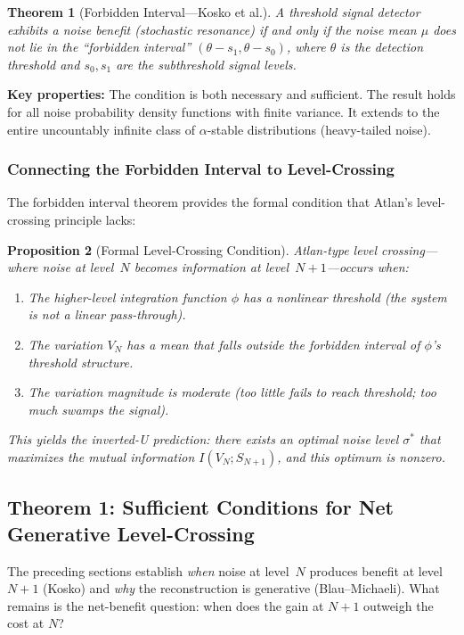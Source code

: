 \documentclass[12pt,letterpaper]{article}
\newtheorem{theorem}{Theorem}[section]
\newtheorem{proposition}[theorem]{Proposition}
\theoremstyle{definition}
\theoremstyle{remark}
\begin{document}
\begin{theorem}[Forbidden Interval---Kosko et al.]
A threshold signal detector exhibits a noise benefit (stochastic resonance) if and only if the noise mean $\mu$ does \emph{not} lie in the ``forbidden interval'' $(\theta - s_1, \theta - s_0)$, where $\theta$ is the detection threshold and $s_0, s_1$ are the subthreshold signal levels.
\end{theorem}

\textbf{Key properties:} The condition is both necessary and sufficient. The result holds for all noise probability density functions with finite variance. It extends to the entire uncountably infinite class of $\alpha$-stable distributions (heavy-tailed noise).

\subsubsection{Connecting the Forbidden Interval to Level-Crossing}

The forbidden interval theorem provides the formal condition that Atlan's level-crossing principle lacks:

\begin{proposition}[Formal Level-Crossing Condition]
\label{prop:levelcrossing}
Atlan-type level crossing---where noise at level~$N$ becomes information at level~$N{+}1$---occurs when:
\begin{enumerate}
    \item The higher-level integration function $\phi$ has a nonlinear threshold (the system is not a linear pass-through).
    \item The variation $V_N$ has a mean that falls outside the forbidden interval of $\phi$'s threshold structure.
    \item The variation magnitude is moderate (too little fails to reach threshold; too much swamps the signal).
\end{enumerate}
This yields the inverted-U prediction: there exists an optimal noise level $\sigma^*$ that maximizes the mutual information $I(V_N; S_{N+1})$, and this optimum is nonzero.
\end{proposition}


\subsection{Theorem 1: Sufficient Conditions for Net Generative Level-Crossing}
\label{sec:theorem1}

The preceding sections establish \emph{when} noise at level~$N$ produces benefit at level~$N{+}1$ (Kosko) and \emph{why} the reconstruction is generative (Blau--Michaeli). What remains is the net-benefit question: when does the gain at $N{+}1$ outweigh the cost at $N$?
\end{document}

